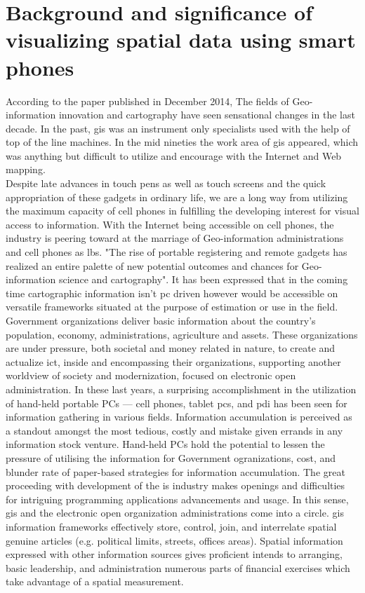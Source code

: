 \section{Background and significance of visualizing spatial data using smart phones}

According to the paper published in December 2014\cite{GSR_3}, The fields of Geo-information innovation and cartography have seen sensational changes in the last decade. In the past, \gls{gis} was an instrument only specialists used with the help of top of the line machines. In the mid nineties the work area of \gls{gis} appeared, which was anything but difficult to utilize and encourage with the Internet and Web mapping. \\
Despite late advances in touch pens as well as touch screens and the quick appropriation of these gadgets in ordinary life, we are a long way from utilizing the maximum capacity of cell phones in fulfilling the developing interest for visual access to information. With the Internet being accessible on cell phones, the industry is peering toward at the marriage of Geo-information administrations and cell phones as \gls{lbs}. "The rise of portable registering and remote gadgets has realized an entire palette of new potential outcomes and chances for Geo-information science and cartography". It has been expressed that in the coming time cartographic information isn't \gls{pc} driven however would be accessible on versatile frameworks situated at the purpose of estimation or use in the field. \\
Government organizations deliver basic information about the country's population, economy, administrations, agriculture and assets. These organizations are under pressure, both societal and money related in nature, to create and actualize \gls{ict}, inside and encompassing their organizations, supporting another worldview of society and modernization, focused on electronic open administration. In these last years, a surprising accomplishment in the utilization of hand-held portable PCs — cell phones, tablet \gls{pc}s, and \gls{pdi} has been seen for information gathering in various fields.
Information accumulation is perceived as a standout amongst the most tedious, costly and mistake given errands in any information stock venture. Hand-held PCs hold the potential to lessen the pressure of utilising the information for Government ogranizations, cost, and blunder rate of paper-based strategies for information accumulation. The great proceeding with development of the \gls{is} industry makes openings and difficulties for intriguing programming applications advancements and usage. In this sense, \gls{gis} and the electronic open organization administrations come into a circle. \gls{gis} information frameworks effectively store, control, join, and interrelate spatial genuine articles (e.g. political limits, streets, offices areas). Spatial information expressed with other information sources gives proficient intends to arranging, basic leadership, and administration numerous parts of financial exercises which take advantage of a spatial measurement.

